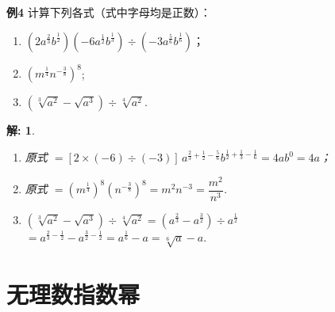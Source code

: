 \documentclass[aspectratio=169,13pt,t,fleqn] {beamer}
\newtheorem*{solve}{解:}
\theoremstyle{definition}
\begin{document}
\begin{frame}{}
	\setcounter{exam}{3}

	{\bfseries 例4}	计算下列各式（式中字母均是正数）：
		\begin{enumerate}[(1)]
			\item \(\left(2a^{\frac{2}{3}}b^{\frac{1}{2}}\right)\left(-6a^{\frac{1}{2}}b^{\frac{1}{3}}\right)\div\left(-3a^{\frac{5}{6}}b^{\frac{1}{6}}\right)\)；
			\item \(\left(m^{\frac{1}{4}}n^{-\frac{3}{8}}\right)^8\);
			\item $(\sqrt[3]{a^2} - \sqrt{a^3}) \div \sqrt[4]{a^2}$.
		\end{enumerate}

	\pause
	\begin{solve}
		\begin{enumerate}[(1)]
			\item 原式 \(=[2\times(-6)\div(-3)]\,a^{\frac{2}{3}+\frac{1}{2}-\frac{5}{6}}b^{\frac{1}{2}+\frac{1}{3}-\frac{1}{6}}=4ab^{0}=4a\)；
			\item 原式 \(=(m^{\frac{1}{4}})^8(n^{-\frac{3}{8}})^8=m^2 n^{-3}=\dfrac{m^2}{n^3}\).
			\item $(\sqrt[3]{a^2} - \sqrt{a^3}) \div \sqrt[4]{a^2}
			=(a^{\frac{2}{3}} - a^{\frac{3}{2}}) \div a^{\frac{1}{2}} $\\[5pt]			
		
			$= a^{\frac{2}{3} -\frac{1}{2}} - a^{\frac{3}{2}-\frac{1}{2}} 
			= a^{\frac{1}{6}} -a 
			= \sqrt[6]{a} -a.$
		\end{enumerate}
	\end{solve}
\end{frame}

\section{无理数指数幂}
\end{document}
